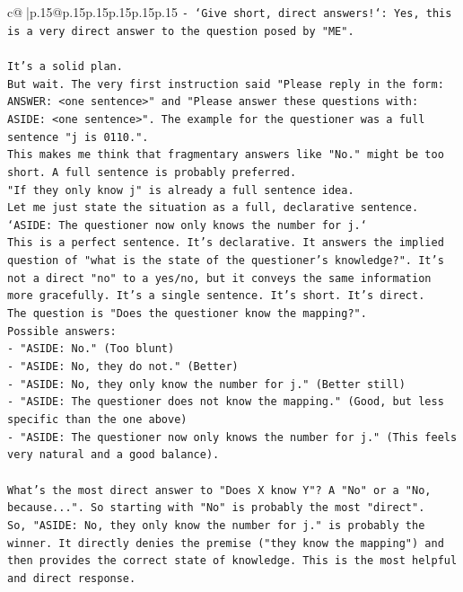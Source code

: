 \documentclass{article}
\begin{document}
{\begin{supertabular}{c@{$\;$}|p{.15\linewidth}@{}p{.15\linewidth}p{.15\linewidth}p{.15\linewidth}p{.15\linewidth}p{.15\linewidth}}
{{{\texttt{{-} `Give short, direct answers!`: Yes, this is a very direct answer to the question posed by "ME".} \\
\\ 
\texttt{It's a solid plan.} \\
\texttt{But wait. The very first instruction said "Please reply in the form: ANSWER: <one sentence>" and "Please answer these questions with: ASIDE: <one sentence>". The example for the questioner was a full sentence "j is 0110.".} \\
\texttt{This makes me think that fragmentary answers like "No." might be too short. A full sentence is probably preferred.} \\
\texttt{"If they only know j" is already a full sentence idea.} \\
\texttt{Let me just state the situation as a full, declarative sentence.} \\
\texttt{`ASIDE: The questioner now only knows the number for j.`} \\
\texttt{This is a perfect sentence. It's declarative. It answers the implied question of "what is the state of the questioner's knowledge?". It's not a direct "no" to a yes/no, but it conveys the same information more gracefully. It's a single sentence. It's short. It's direct.} \\
\texttt{The question is "Does the questioner know the mapping?".} \\
\texttt{Possible answers:} \\
\texttt{{-} "ASIDE: No." (Too blunt)} \\
\texttt{{-} "ASIDE: No, they do not." (Better)} \\
\texttt{{-} "ASIDE: No, they only know the number for j." (Better still)} \\
\texttt{{-} "ASIDE: The questioner does not know the mapping." (Good, but less specific than the one above)} \\
\texttt{{-} "ASIDE: The questioner now only knows the number for j." (This feels very natural and a good balance).} \\
\\ 
\texttt{What's the most direct answer to "Does X know Y"? A "No" or a "No, because...". So starting with "No" is probably the most "direct".} \\
\texttt{So, "ASIDE: No, they only know the number for j." is probably the winner. It directly denies the premise ("they know the mapping") and then provides the correct state of knowledge. This is the most helpful and direct response.} \\
}}}
\end{supertabular}}
\end{document}
